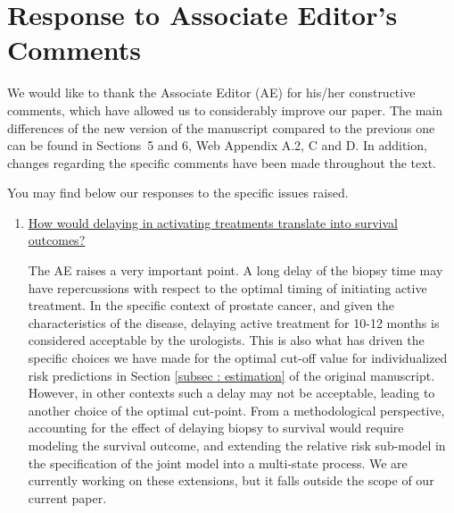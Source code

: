 \clearpage
\section*{Response to Associate Editor's Comments}
We would like to thank the Associate Editor (AE) for his/her constructive comments, which have allowed us to considerably improve our paper. The main differences of the new version of the manuscript compared to the previous one can be found in Sections~5 and 6, Web Appendix A.2, C and D. In addition, changes regarding the specific comments have been made throughout the text.

You may find below our responses to the specific issues raised.

\begin{enumerate}
	\item \underline{How would delaying in activating treatments translate into survival outcomes?}

The AE raises a very important point. A long delay of the biopsy time may have repercussions with respect to the optimal timing of initiating active treatment. In the specific context of prostate cancer, and given the characteristics of the disease, delaying active treatment for 10-12 months is considered acceptable by the urologists. This is also what has driven the specific choices we have made for the optimal cut-off value for individualized risk predictions in Section \ref{subsec : estimation} of the original manuscript. However, in other contexts such a delay may not be acceptable, leading to another choice of the optimal cut-point. From a methodological perspective, accounting for the effect of delaying biopsy to survival would require modeling the survival outcome, and extending the relative risk sub-model in the specification of the joint model into a multi-state process. We are currently working on these extensions, but it falls outside the scope of our current paper.

\end{enumerate}

